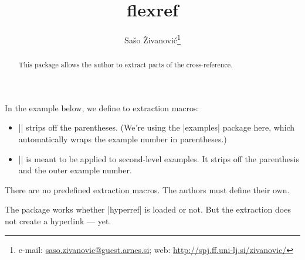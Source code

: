 \documentclass[a4paper]{ltxdoc}
\author{Sašo Živanović\footnote{%
    e-mail: \href{mailto:saso.zivanovic@guest.arnes.si}{saso.zivanovic@guest.arnes.si};
    web: \href{http://spj.ff.uni-lj.si/zivanovic/}{http://spj.ff.uni-lj.si/zivanovic/}}}
\title{flexref}
\begin{document}
\maketitle

\begin{abstract}
  This package allows the author to extract parts of the cross-reference.
\end{abstract}

In the example below, we define to extraction macros:
\begin{itemize}
\item |\plainref| strips off the parentheses.  (We're using the |examples|
    package here, which automatically wraps the example number in parentheses.)
\item |\iref| is meant to be applied to second-level examples.  It strips off
  the parenthesis and the outer example number.
\end{itemize}


There are no predefined extraction macros.  The authors must define their own.

The package works whether |hyperref| is loaded or not.  But the extraction
does not create a hyperlink --- yet.
\end{document}
